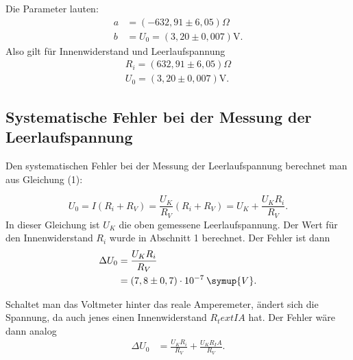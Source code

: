 Die Parameter lauten:
\begin{align*}
a &= (-632,91 \pm 6,05)\Omega \\
b &= U_0 =  (3,20 \pm 0,007)\si{\volt} .
\end{align*}
Also gilt für Innenwiderstand und Leerlaufspannung
\begin{align*}
R_i = (632,91 \pm 6,05)\Omega \\
U_0 = (3,20 \pm 0,007)\si{\volt} .
\end{align*}


\subsection{Systematische Fehler bei der Messung der Leerlaufspannung}
Den systematischen Fehler bei der Messung der Leerlaufspannung berechnet man aus Gleichung (1):

\begin{equation}
U_0 = I(R_i + R_V) = \frac{U_K}{R_V}(R_i + R_V) = U_K + \frac{U_K R_i}{R_V} .
\end{equation}
In dieser Gleichung ist $U_K$ die oben gemessene Leerlaufspannung.
Der Wert für den Innenwiderstand $R_i$ wurde in Abschnitt 1 berechnet. 
Der Fehler ist dann
\begin{align*}
\Delta U_0 &= \frac{U_K R_i}{R_V}  \\
&= (7,8 \pm 0,7) \cdot 10^{-7} \: \symup{V} .
\end{align*}

\noindent Schaltet man das Voltmeter hinter das reale Amperemeter, ändert sich die Spannung, da auch jenes einen Innenwiderstand $R_text{IA}$ hat.
Der Fehler wäre dann analog
\begin{align*}
\Delta U_0 &= \frac{U_K R_i}{R_V}+\frac{U_K R_IA}{R_V} .  \\
\end{align*}

